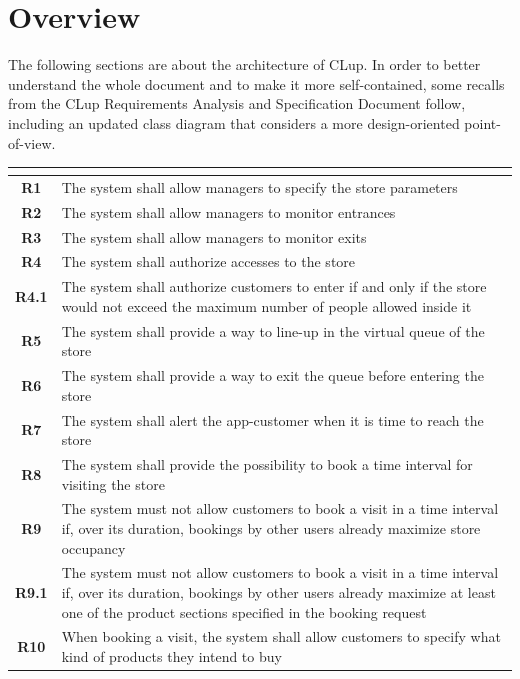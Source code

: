 \documentclass[a4paper,oneside,11pt]{book}
\begin{document}
    \section{Overview}
    The following sections are about the architecture of CLup. In order to better understand the whole document and to make it more self-contained, some recalls from the CLup Requirements Analysis and Specification Document follow, including an updated class diagram that considers a more design-oriented point-of-view.
    \begin{longtable}[c]{|>{\bfseries{}}c|H{.65\textwidth}|}
        \hline
         \\ \hline
        R1 & The system shall allow managers to specify the store parameters \\ \hline
        R2 & The system shall allow managers to monitor entrances \\ \hline
        R3 & The system shall allow managers to monitor exits \\ \hline
        R4 & The system shall authorize accesses to the store \\ \hline
        R4.1 & The system shall authorize customers to enter if and only if the store would not exceed the maximum number of people allowed inside it \\ \hline
        R5 & The system shall provide a way to line-up in the virtual queue of the store \\ \hline
        R6 & The system shall provide a way to exit the queue before entering the store \\ \hline
        R7 & The system shall alert the app-customer when it is time to reach the store \\ \hline
        R8 & The system shall provide the possibility to book a time interval for visiting the store \\ \hline
        R9 & The system must not allow customers to book a visit in a time interval if, over its duration, bookings by other users already maximize store occupancy \\ \hline
        R9.1 & The system must not allow customers to book a visit in a time interval if, over its duration, bookings by other users already maximize at least one of the product sections specified in the booking request \\ \hline
        R10 & When booking a visit, the system shall allow customers to specify what kind of products they intend to buy \\ \hline

\end{longtable}
\end{document}
